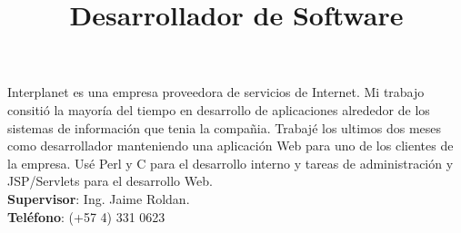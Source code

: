 \begin{resume}
\title{\textbf{Desarrollador de Software}}
\begin{position}
Interplanet es una empresa proveedora de servicios de Internet. Mi trabajo consiti\'{o} la mayor\'{i}a del tiempo en desarrollo de aplicaciones alrededor de los sistemas de informaci\'{o}n que tenia  la compa\~{n}ia.
Trabaj\'{e} los ultimos dos meses como desarrollador manteniendo una aplicaci\'{o}n Web para uno de los clientes de la empresa. Us\'{e} Perl y C para el desarrollo interno y tareas de administraci\'{o}n y JSP/Servlets para el desarrollo Web.\\
\textbf{Supervisor}:  Ing. Jaime Roldan.\\
\textbf{Tel\'{e}fono}:  (+57 4) 331 0623 
\end{position}

 \begin{formatb}
   \\
   \body\\
 \end{formatb}



\end{resume}
